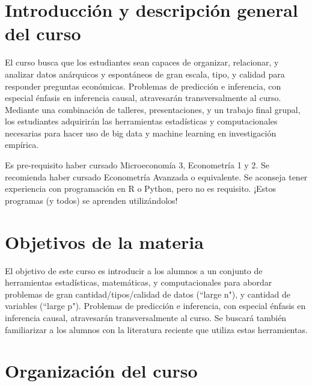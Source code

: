 \documentclass[11pt]{article}
\begin{document}
\section{Introducción y descripción general del curso}

El curso busca que los estudiantes sean capaces de organizar, relacionar, y analizar datos anárquicos y espontáneos de gran escala, tipo, y calidad para responder preguntas económicas. Problemas de predicción e inferencia, con especial énfasis en inferencia causal, atravesarán transversalmente al curso. Mediante una combinación de talleres, presentaciones, y un trabajo final grupal, los estudiantes adquirirán las herramientas estadísticas y computacionales necesarias para hacer uso de big data y machine learning en investigación empírica.

Es pre-requisito haber cursado Microeconomía 3, Econometría 1 y 2. Se recomienda haber cursado Econometría Avanzada o equivalente. Se aconseja tener experiencia con programación en R o Python, pero no es requisito. ¡Estos programas (y todos) se aprenden utilizándolos! 



\section{Objetivos de la materia}


El objetivo de este curso es introducir a los alumnos a un conjunto de herramientas estadísticas, matemáticas, y computacionales para abordar problemas de gran cantidad/tipos/calidad de datos (“large n"), y cantidad de variables (“large p"). Problemas de predicción e inferencia, con especial énfasis en inferencia causal, atravesarán transversalmente al curso. Se buscará también familiarizar a los alumnos con la literatura reciente que utiliza estas herramientas. 




\section{Organización del curso}
\end{document}
